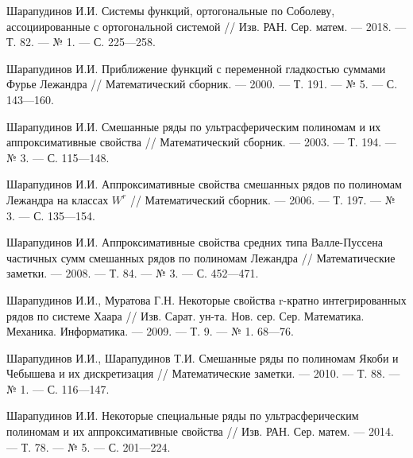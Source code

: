 \begin{thebibliography}{99}

Шарапудинов И.И. Системы функций, ортогональные по Соболеву, ассоциированные с ортогональной системой // Изв. РАН. Сер. матем. --- 2018. --- Т. 82. --- № 1. --- С. 225---258.





Шарапудинов И.И. Приближение функций с переменной гладкостью суммами Фурье Лежандра // Математический сборник. --- 2000. --- Т. 191. --- № 5. --- С. 143---160.





Шарапудинов И.И. Смешанные ряды по ультрасферическим полиномам и их аппроксимативные свойства // Математический сборник. --- 2003. --- Т. 194. --- № 3. --- С. 115---148.





Шарапудинов И.И. Аппроксимативные свойства смешанных рядов по полиномам Лежандра на классах $W^r$ // Математический сборник. --- 2006. --- Т. 197. --- № 3. --- С. 135---154.




Шарапудинов И.И. Аппроксимативные свойства средних типа Валле-Пуссена частичных сумм смешанных рядов по полиномам Лежандра // Математические заметки. --- 2008. --- Т. 84. --- № 3. --- С. 452---471.




Шарапудинов И.И., Муратова Г.Н. Некоторые свойства r-кратно интегрированных рядов по системе Хаара // Изв. Сарат. ун-та. Нов. сер. Сер. Математика. Механика. Информатика. --- 2009. --- Т. 9. --- № 1. 68---76.





Шарапудинов И.И., Шарапудинов Т.И. Смешанные ряды по полиномам Якоби и Чебышева и их дискретизация // Математические заметки. --- 2010. --- Т. 88. --- № 1. --- С. 116---147.





Шарапудинов И.И. Некоторые специальные ряды по ультрасферическим полиномам и их аппроксимативные свойства // Изв. РАН. Сер. матем. --- 2014. --- Т. 78. --- № 5. --- С. 201---224.






\end{thebibliography}
